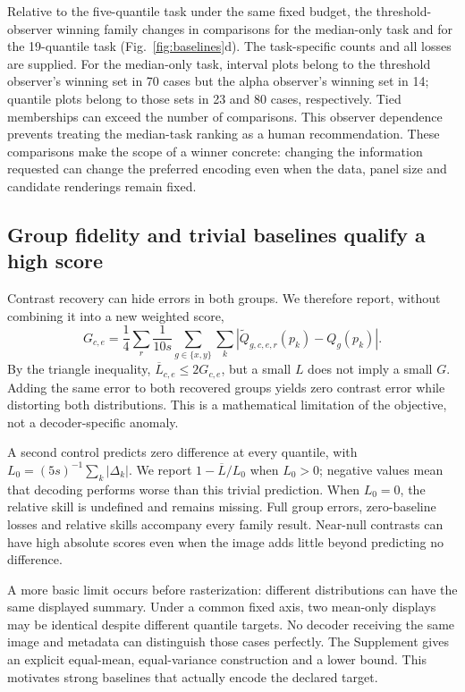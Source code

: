 \documentclass[11pt]{article}
\begin{document}
Relative to the five-quantile task under the same fixed budget, the threshold-observer winning family changes in \MedianTaskChanges{} comparisons for the median-only task and \DenseTaskChanges{} for the 19-quantile task (Fig.~\ref{fig:baselines}d). The task-specific counts and all losses are supplied. For the median-only task, interval plots belong to the threshold observer's winning set in 70 cases but the alpha observer's winning set in 14; quantile plots belong to those sets in 23 and 80 cases, respectively. Tied memberships can exceed the number of comparisons. This observer dependence prevents treating the median-task ranking as a human recommendation. These comparisons make the scope of a winner concrete: changing the information requested can change the preferred encoding even when the data, panel size and candidate renderings remain fixed.

\subsection*{Group fidelity and trivial baselines qualify a high score}
Contrast recovery can hide errors in both groups. We therefore report, without combining it into a new weighted score,
\begin{equation}
G_{c,e}=\frac{1}{4}\sum_r\frac{1}{10s}\sum_{g\in\{x,y\}}\sum_k|\widetilde Q_{g,c,e,r}(p_k)-Q_g(p_k)|.
\end{equation}
By the triangle inequality, $\overline L_{c,e}\leq2G_{c,e}$, but a small $L$ does not imply a small $G$. Adding the same error to both recovered groups yields zero contrast error while distorting both distributions. This is a mathematical limitation of the objective, not a decoder-specific anomaly.

A second control predicts zero difference at every quantile, with $L_0=(5s)^{-1}\sum_k|\Delta_k|$. We report $1-\overline L/L_0$ when $L_0>0$; negative values mean that decoding performs worse than this trivial prediction. When $L_0=0$, the relative skill is undefined and remains missing. Full group errors, zero-baseline losses and relative skills accompany every family result. Near-null contrasts can have high absolute scores even when the image adds little beyond predicting no difference.

A more basic limit occurs before rasterization: different distributions can have the same displayed summary. Under a common fixed axis, two mean-only displays may be identical despite different quantile targets. No decoder receiving the same image and metadata can distinguish those cases perfectly. The Supplement gives an explicit equal-mean, equal-variance construction and a lower bound. This motivates strong baselines that actually encode the declared target.
\end{document}
